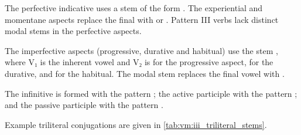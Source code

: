 \documentclass[grammar]{subfiles}
\begin{document}
The perfective indicative uses a stem of the form . The
experiential and momentane aspects replace the final  with  or
.  Pattern III verbs lack distinct modal stems in the perfective aspects.  

The imperfective aspects (progressive, durative and  habitual) use the stem
, where V₁ is the inherent vowel and V₂ is  for the
progressive aspect,  for the durative, and  for the habitual.
The modal stem replaces the final vowel with . 

The infinitive is formed with the pattern ; the active participle
with the pattern ; and the passive participle with the pattern
.

Example triliteral conjugations are given in \cref{tab:vm:iii_triliteral_stems}. 

\begin{table}[h!]\small\capstart
  \centering
  \\
  \caption{Pattern III triliteral stems \label{tab:vm:iii_triliteral_stems}}
\end{table}
\end{document}
